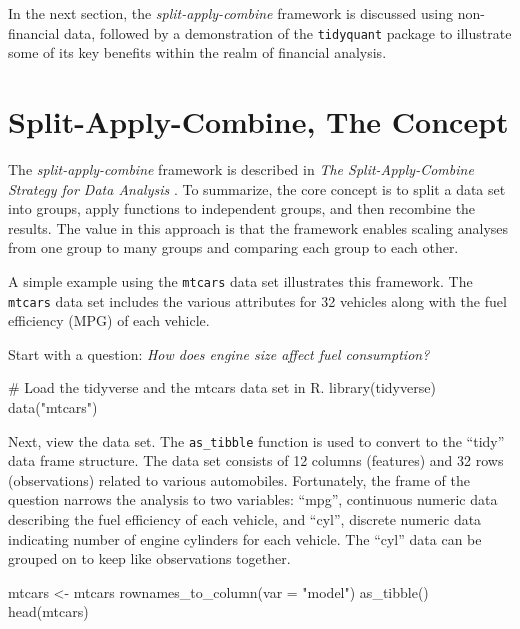 In the next section, the \emph{split-apply-combine} framework is
discussed using non-financial data, followed by a demonstration of the
\texttt{tidyquant} package to illustrate some of its key benefits within
the realm of financial analysis.

\section{Split-Apply-Combine, The
Concept}\label{split-apply-combine-the-concept}

The \emph{split-apply-combine} framework is described in \emph{The
Split-Apply-Combine Strategy for Data Analysis} \citep{plyr}. To
summarize, the core concept is to split a data set into groups, apply
functions to independent groups, and then recombine the results. The
value in this approach is that the framework enables scaling analyses
from one group to many groups and comparing each group to each other.

A simple example using the \texttt{mtcars} data set illustrates this
framework. The \texttt{mtcars} data set includes the various attributes
for 32 vehicles along with the fuel efficiency (MPG) of each vehicle.

Start with a question: \emph{How does engine size affect fuel
consumption?}

\begin{Schunk}
\begin{Sinput}
# Load the tidyverse and the mtcars data set in R.
library(tidyverse)
data("mtcars")
\end{Sinput}
\end{Schunk}

Next, view the data set. The \texttt{as\_tibble} function is used to
convert to the ``tidy'' data frame structure. The data set consists of
12 columns (features) and 32 rows (observations) related to various
automobiles. Fortunately, the frame of the question narrows the analysis
to two variables: ``mpg'', continuous numeric data describing the fuel
efficiency of each vehicle, and ``cyl'', discrete numeric data
indicating number of engine cylinders for each vehicle. The ``cyl'' data
can be grouped on to keep like observations together.

\begin{Schunk}
\begin{Sinput}
mtcars <- mtcars %
    rownames_to_column(var = "model") %
    as_tibble()
head(mtcars)
\end{Sinput}
\end{Schunk}

